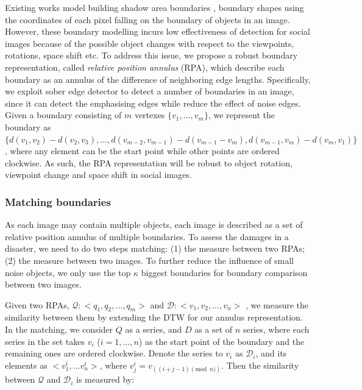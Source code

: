 \documentclass[runningheads,a4paper]{llncs}
\begin{document}
Existing works model building shadow area boundaries \cite{turker2008building}, boundary shapes \cite{rs2051217} using the coordinates of each pixel falling on the boundary of objects in an image. 
However, these boundary modelling incurs low effectiveness of detection for social images because of the possible object changes with respect to the viewpoints, rotations, space shift etc. 
To address this issue, we propose a robust boundary representation, called \emph{relative position annulus} (RPA), 
which describe each boundary as an annulus of the difference of neighboring edge lengths. 
Specifically, we exploit sober edge detector to detect a number of boundaries in an image, 
since it can detect the emphasising edges while reduce the effect of noise edges. Given a boundary consisting of $m$ vertexes $\{v_1,...,v_m\}$, we represent the boundary as $\{d(v_1,v_2)-d(v_2,v_3),...,d(v_{m-2},v_{m-1})-d(v_{m-1}-v_m), d(v_{m-1},v_m)-d(v_m,v_1)\}$, where any element can be the start point while other points are ordered clockwise. As such, the RPA representation will be robust to object rotation, viewpoint change and space shift in social images.

\subsubsection{Matching boundaries}
As each image may contain multiple objects, each image is described as a set of relative position annulus of multiple boundaries. 
To assess the damages in a disaster, we need to do two steps matching: 
(1) the measure between two RPAs; 
(2) the measure between two images. 
To further reduce the influence of small noise objects, we only use the top $\kappa$ biggest boundaries for boundary comparison between two images.

Given two RPAs, $\mathcal{Q}: <q_1, q_2,...,q_m>$ and $\mathcal{D}: <v_1,v_2,...,v_{n}>$ , we measure the similarity between them by extending the DTW \cite{Berndt:1994:UDT:3000850.3000887} for our annulus representation. In the matching, we consider $Q$ as a series, and $D$ as a set of $n$ series, where each series in the set takes $v_i$ ($i=1,...,n$) as the start point of the boundary and the remaining ones are ordered clockwise. Denote the series to $v_i$ as $\mathcal{D}_i$, and its elements as $<v_1^i,...v_n^i>$, where $v_j^i=v_{((i+j-1)\pmod n)}$. Then the similarity between $\mathcal{Q}$ and $\mathcal{D}_i$ is measured by:
\end{document}
